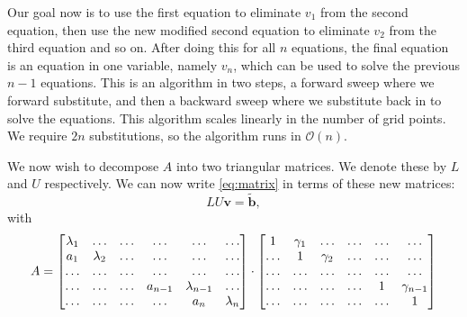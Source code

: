 \documentclass[10pt,a4paper]{amsart}
\begin{document}
  Our goal now is to use the first equation to eliminate $v_1$ from the second
  equation, then use the new modified second equation to eliminate $v_2$ from
  the third equation and so on. After doing this for all $n$ equations, the
  final equation is an equation in one variable, namely $v_{n}$, which can be
  used to solve the previous $n-1$ equations.  This is an algorithm in two
  steps, a forward sweep where we forward substitute, and then a backward sweep
  where we substitute back in to solve the equations.  This algorithm scales
  linearly in the number of grid points. We require $2n$ substitutions, so the
  algorithm runs in $\mathcal{O}(n)$.
  
  We now wish to decompose $A$ into two triangular matrices. We denote these by
  $L$ and $U$ respectively.  We can now write \cref{eq:matrix} in terms of
  these new matrices:
  \begin{equation}
    \label{eq:lu}
    L U \mathbf v = \mathbf{\tilde{b}},
  \end{equation}
  with 
  \begin{equation}
    \notag
    A = \begin{bmatrix}
      \lambda_1 & \ldots & \ldots & \ldots & \ldots & \ldots\\
      a_1 & \lambda_2 & \ldots & \ldots & \ldots & \ldots\\
      \ldots & \ldots & \ldots & \ldots & \ldots & \ldots\\ 
      \ldots & \ldots & \ldots & a_{n-1} & \lambda_{n-1} & \ldots\\
      \ldots & \ldots & \ldots & \ldots & a_{n} & \lambda_{n} \\
    \end{bmatrix}\cdot
    \begin{bmatrix}
      1 & \gamma_1 & \ldots & \ldots & \ldots & \ldots\\
      \ldots & 1 & \gamma_2 & \ldots & \ldots & \ldots\\
      \ldots & \ldots & \ldots & \ldots & \ldots & \ldots\\ 
      \ldots & \ldots & \ldots & \ldots & 1 & \gamma_{n-1} \\
      \ldots & \ldots & \ldots & \ldots & \ldots & 1 \\
    \end{bmatrix}
  \end{equation}
 
\end{document}
